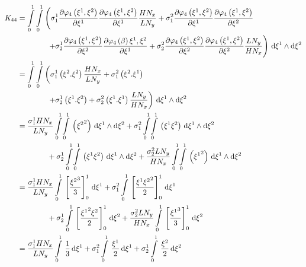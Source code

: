 \begin{equation}
  \begin{aligned}
    K_{44}&=\dintl{0}{1}\dintl{0}{1}\left(
    \conductivitytensorsymbol^{1}_{1}\delby{\lbfn{4}{\xione,\xitwo}}{\xione}
    \delby{\lbfn{4}{\xione,\xitwo}}{\xione}\dfrac{H N_{x}}{L N_{y}}+
    \conductivitytensorsymbol^{2}_{1}\delby{\lbfn{4}{\xione,\xitwo}}{\xione}
    \delby{\lbfn{4}{\xione,\xitwo}}{\xitwo}\right.\\
    &\qquad\qquad\left.+\conductivitytensorsymbol^{1}_{2}\delby{\lbfn{4}{\xione,\xitwo}}{\xitwo}
    \delby{\lbfn{4}{\beta}{\xione,\xitwo}}{\xione}+
    \conductivitytensorsymbol^{2}_{2}\delby{\lbfn{4}{\xione,\xitwo}}{\xitwo}
    \delby{\lbfn{4}{\xione,\xitwo}}{\xitwo}\dfrac{L N_{y}}{H N_{x}}\right)\infinitesimaltwo{\xione}{\xitwo}\\
    &=\dintl{0}{1}\dintl{0}{1}\left(
    \conductivitytensorsymbol^{1}_{1}\pbrac{\xitwo.\xitwo}\dfrac{H N_{x}}{L N_{y}}+
    \conductivitytensorsymbol^{2}_{1}\pbrac{\xitwo.\xione}\right.\\
    &\qquad\qquad\left.+\conductivitytensorsymbol^{1}_{2}\pbrac{\xione.\xitwo}+
    \conductivitytensorsymbol^{2}_{2}\pbrac{\xione.\xione}\dfrac{L N_{y}}{H N_{x}}\right)
    \infinitesimaltwo{\xione}{\xitwo}\\
    &=\dfrac{\conductivitytensorsymbol^{1}_{1} H N_{x}}{L N_{y}}\giint{0}{1}{0}{1}{\pbrac{\xitwosq}}{\xione}{\xitwo}
    +\conductivitytensorsymbol^{2}_{1}\giint{0}{1}{0}{1}{\pbrac{\xione\xitwo}}{\xione}{\xitwo}\\
    &\qquad\qquad+\conductivitytensorsymbol^{1}_{2}\giint{0}{1}{0}{1}{\pbrac{\xione\xitwo}}{\xione}{\xitwo}
    +\dfrac{\conductivitytensorsymbol^{2}_{2} L N_{y}}{H N_{x}}\giint{0}{1}{0}{1}{\pbrac{\xionesq}}{\xione}{\xitwo} \\
    &=\dfrac{\conductivitytensorsymbol^{1}_{1} H N_{x}}{L N_{y}}\gint{0}{1}{\sqbrac{\dfrac{\xitwocube}{3}}^{1}_{0}}{\xione}
    +\conductivitytensorsymbol^{2}_{1}\gint{0}{1}{\sqbrac{\dfrac{\xione\xitwosq}{2}}^{1}_{0}}{\xione}\\
    &\qquad\qquad+\conductivitytensorsymbol^{1}_{2}\gint{0}{1}{\sqbrac{\dfrac{\xionesq\xitwo}{2}}^{1}_{0}}{\xitwo}
    +\dfrac{\conductivitytensorsymbol^{2}_{2} L N_{y}}{H N_{x}}\gint{0}{1}{\sqbrac{\dfrac{\xionecube}{3}}^{1}_{0}}{\xitwo} \\
    &=\dfrac{\conductivitytensorsymbol^{1}_{1} H N_{x}}{L N_{y}}\gint{0}{1}{\dfrac{1}{3}}{\xione}
    +\conductivitytensorsymbol^{2}_{1}\gint{0}{1}{\dfrac{\xione}{2}}{\xione}
    +\conductivitytensorsymbol^{1}_{2}\gint{0}{1}{\dfrac{\xitwo}{2}}{\xitwo}

\end{aligned}
\end{equation}
